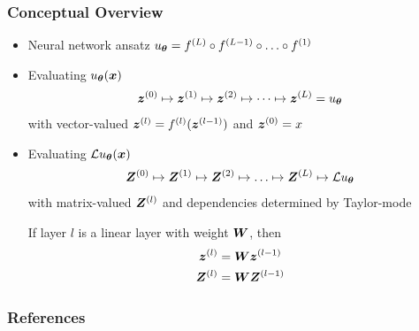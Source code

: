 \documentclass[12pt,usepdftitle=false,aspectratio=169]{beamer}
\begin{document}
\begin{frame}
  \frametitle{Conceptual Overview}
  \begin{itemize}
  \item Neural network ansatz $u_{{\bm{\theta}}} = f^{(L)} \circ f^{(L-1)} \circ
    \ldots \circ f^{(1)}$
  \item Evaluating $u_{{\bm{\theta}}}({\bm{x}})$
    \begin{align*}
      {\bm{z}}^{(0)} \mapsto {\bm{z}}^{(1)}\mapsto {\bm{z}}^{(2)} \mapsto \dots \mapsto {\bm{z}}^{(L)} = u_{{\bm{\theta}}}
    \end{align*}
    with vector-valued ${\bm{z}}^{(l)} = f^{(l)}({\bm{z}}^{(l-1)})$ and ${\bm{z}}^{(0)} = x$

  \item Evaluating ${\mathcal{L}} u_{{\bm{\theta}}}({\bm{x}})$
    \begin{align*}
      {\bm{Z}}^{(0)} \mapsto {\bm{Z}}^{(1)} \mapsto {\bm{Z}}^{(2)} \mapsto \ldots \mapsto {\bm{Z}}^{(L)} \mapsto {\mathcal{L}} u_{{\bm{\theta}}}
    \end{align*}
    with matrix-valued ${\bm{Z}}^{(l)}$ and dependencies determined by Taylor-mode

    If layer $l$ is a linear layer with weight ${\bm{W}}$, then
    \begin{align*}
      {\bm{z}}^{(l)} &= {\bm{W}} {\bm{z}}^{(l-1)}
      \\
      {\bm{Z}}^{(l)} &= {\bm{W}} {\bm{Z}}^{(l-1)}
    \end{align*}

  \end{itemize}

\end{frame}






\begin{frame}[allowframebreaks]
  \frametitle{References}

  {\footnotesize
    
    
  }
\end{frame}
\end{document}
